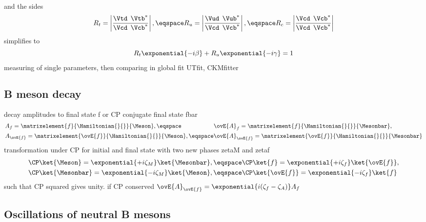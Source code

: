 %
and the sides
%
\begin{equation}
  R_t = \left| \frac{\Vtd^{\phantom{\ast}}\Vtb^{\ast}}{\Vcd^{\phantom{\ast}}\Vcb^{\ast}} \right|,\eqspace
  R_u = \left| \frac{\Vud^{\phantom{\ast}}\Vub^{\ast}}{\Vcd^{\phantom{\ast}}\Vcb^{\ast}} \right|,\eqspace
  R_c = \left| \frac{\Vcd^{\phantom{\ast}}\Vcb^{\ast}}{\Vcd^{\phantom{\ast}}\Vcb^{\ast}} \right|
\end{equation}
%
simplifies to
%
\begin{equation}
  R_t \exponential{-i\beta} + R_u \exponential{-i\gamma} = 1
\end{equation}
%
measuring of single parameters, then comparing in global fit
UTfit, CKMfitter

\subsection{B meson decay}
\label{sec:cpv_theory:flavour_physics:bdecays}

decay amplitudes to final state f or CP conjugate final state fbar
%
\begin{equation}
  \begin{alignedat}{2}
    & A_f         = \matrixelement{f}{\Hamiltonian{}{}}{\Meson},        \eqspace && \ovE{A}_f         = \matrixelement{f}{\Hamiltonian{}{}}{\Mesonbar}, \\
    & A_{\ovE{f}} = \matrixelement{\ovE{f}}{\Hamiltonian{}{}}{\Meson},  \eqspace && \ovE{A}_{\ovE{f}} = \matrixelement{\ovE{f}}{\Hamiltonian{}{}}{\Mesonbar}
  \end{alignedat}
\end{equation}
%
transformation under CP for initial and final state with two new phases zetaM and zetaf
%
\begin{equation}
  \begin{alignedat}{2}
    & \CP\ket{\Meson}    = \exponential{+i\zeta_{M}} \ket{\Mesonbar},\eqspace && \CP \ket{f}        = \exponential{+i\zeta_{f}} \ket{\ovE{f}}, \\
    & \CP\ket{\Mesonbar} = \exponential{-i\zeta_{M}} \ket{\Meson}   ,\eqspace && \CP \ket{\ovE{f}}  = \exponential{-i\zeta_{f}} \ket{f}
  \end{alignedat}
\end{equation}
%
such that CP squared gives unity. if CP conserved $\ovE{A}_{\ovE{f}} = \exponential{i(\zeta_f - \zeta_A)} A_f$

\subsection{Oscillations of neutral B mesons}
\label{sec:cpv_theory:flavour_physics:bmixing}

